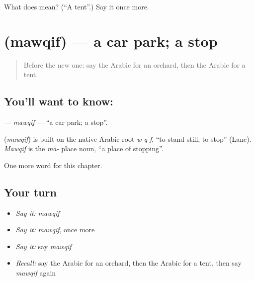 \begin{tcolorbox}[breakable,colback=teal!4,colframe=teal!35!black,title={Before you move on}]
What does  mean? (\textquotedblleft{}A tent\textquotedblright{}.) Say it once more.
\end{tcolorbox}
\section[\texorpdfstring{\ar{موقف} (mawqif)}{موقف (mawqif)}]{ (mawqif) — a car park; a stop}

\label{lesson:AR-C173-mawqif}



\begin{quote}
Before the new one: say the Arabic for an orchard, then the Arabic for a tent.
\end{quote}

\subsection*{You'll want to know: }
\textbf{} — \emph{mawqif} — \textquotedblleft{}a car park; a stop\textquotedblright{}.

\begin{cousinweb}
\textbf{} (\emph{mawqif}) is built on the native Arabic root \emph{w-q-f}, \textquotedblleft{}to stand still, to stop\textquotedblright{} (Lane). \emph{Mawqif} is the \emph{ma-} place noun, \textquotedblleft{}a place of stopping\textquotedblright{}.
\end{cousinweb}

\begin{grammarlens}[title={What you've built}]
One more word for this chapter.
\end{grammarlens}

\subsection*{Your turn}
\begin{itemize}
\raggedright
  \item \emph{Say it:} \emph{mawqif}
  \item \emph{Say it:} \emph{mawqif}, once more
  \item \emph{Say it:} say \emph{mawqif}
  \item \emph{Recall:} say the Arabic for an orchard, then the Arabic for a tent, then say \emph{mawqif} again
\end{itemize}

